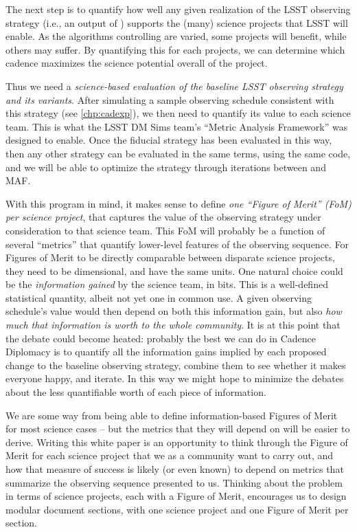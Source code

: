 The next step is to quantify how well any given realization of the
LSST observing strategy (i.e., an output of \OpSim) supports the (many)
science projects that LSST will enable.  As the algorithms controlling
\OpSim are varied, some projects will benefit, while others may
suffer.  By quantifying this for each projects, we can determine which cadence
maximizes the science potential overall of the project.

Thus we need
a {\it science-based evaluation of the baseline
  LSST observing strategy and its variants}. After simulating a sample
observing schedule consistent with this strategy (see
\autoref{chp:cadexp}), we then need to quantify its value to each
science team.  This is what the LSST DM Sims team's ``Metric Analysis
Framework'' was designed to enable. Once the fiducial strategy has
been evaluated in this way, then any other strategy can be evaluated
in the same terms, using the same code, and we will be able to %
optimize the strategy through iterations between \OpSim and MAF.

With this program in mind, it makes sense to define {\it one ``Figure
of Merit'' (FoM) per science project}, that captures the value of  the
observing strategy under consideration to that science team. This FoM
will probably be a function of several ``metrics'' that quantify
lower-level features of the observing sequence.  For Figures of Merit
to be directly comparable between disparate science projects,  they
need to be dimensional, and have the same units. One natural
choice could be the {\it information gained} by the science team, in
bits. This is a well-defined statistical quantity, albeit not yet one
in common use. A given observing schedule's value would then depend on
both this information gain, but also {\it how much that information is
worth to the whole community}. It is at this point that the debate
could become heated: probably the best we can do in Cadence Diplomacy
is to quantify all the information gains implied by each proposed
change to the baseline  observing strategy, combine them to see
whether it makes everyone happy, and iterate. In this way we might
hope to minimize the debates about the less quantifiable worth of each
piece of information.

We are some way from being able to define information-based Figures of
Merit for most science cases -- but the metrics that they will depend
on will be easier to derive. Writing this white paper is an
opportunity to think through the Figure of Merit for each science
project that we as a community want to carry out, and how that measure
of success is likely (or even known) to depend on metrics that
summarize the observing sequence presented to us. Thinking about the
problem in terms of science projects, each with a  Figure of Merit,
encourages us to design modular document sections, with one science
project and one Figure of Merit per section.


